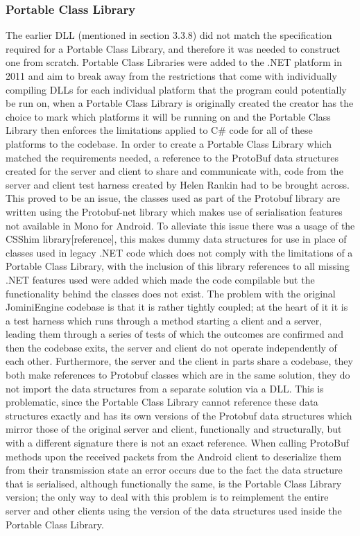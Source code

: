 \documentclass{article}
\begin{document}
\subsubsection{Portable Class Library}
The earlier DLL (mentioned in section 3.3.8) did not match the specification required for a Portable Class Library, and therefore it was needed to construct one from scratch. Portable Class Libraries were added to the .NET platform in 2011 and aim to break away from the restrictions that come with individually compiling DLLs for each individual platform that the program could potentially be run on, when a Portable Class Library is originally created the creator has the choice to mark which platforms it will be running on and the Portable Class Library then enforces the limitations applied to C\# code for all of these platforms to the codebase. In order to create a Portable Class Library which matched the requirements needed, a reference to the ProtoBuf data structures created for the server and client to share and communicate with, code from the server and client test harness created by Helen Rankin had to be brought across. This proved to be an issue, the classes used as part of the Protobuf library are written using the Protobuf-net library which makes use of serialisation features not available in Mono for Android. To alleviate this issue there was a usage of the CSShim library[reference], this makes dummy data structures for use in place of classes used in legacy .NET code which does not comply with the limitations of a Portable Class Library, with the inclusion of this library references to all missing .NET features used were added which made the code compilable but the functionality behind the classes does not exist. The problem with the original JominiEngine codebase is that it is rather tightly coupled; at the heart of it it is a test harness which runs through a method starting a client and a server, leading them through a series of tests of which the outcomes are confirmed and then the codebase exits, the server and client do not operate independently of each other. Furthermore, the server and the client in parts share a codebase, they both make references to Protobuf classes which are in the same solution, they do not import the data structures from a separate solution via a DLL. This is problematic, since the Portable Class Library cannot reference these data structures exactly and has its own versions of the Protobuf data structures which mirror those of the original server and client, functionally and structurally, but with a different signature there is not an exact reference. When calling ProtoBuf methods upon the received packets from the Android client to deserialize them from their transmission state an error occurs due to the fact the data structure that is serialised, although functionally the same, is the Portable Class Library version; the only way to deal with this problem is to reimplement the entire server and other clients using the version of the data structures used inside the Portable Class Library.
\end{document}
